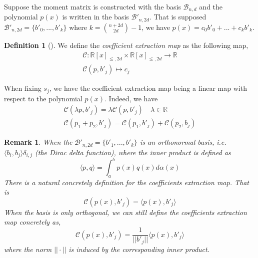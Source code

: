 \documentclass[12pt]{amsart}
\numberwithin{equation}{section}
\newtheorem{remark}[thm]{Remark}
\theoremstyle{definition}
\newtheorem{definition}[thm]{Definition}
\numberwithin{thm}{section}
\begin{document}
Suppose the moment matrix is constructed with the basis $\mathcal{B}_{n, d}$ and the polynomial $p(x)$ is written in the basis $\mathcal{B}'_{n, 2d}$. 
That is supposed $\mathcal{B}'_{n, 2d} = \{b'_0, ..., b'_k\}$ where $k = {n + 2d \choose 2d} - 1$, we have $p(x) = c_0b'_0 + ... + c_kb'_k$.
\begin{definition}[\cite{Recher:Masterthesis}]
     \label{def:cem}
We define the \emph{coefficient extraction map} as the following map,
\begin{equation*}
     \begin{split}
     \mathcal{C}: \mathbb{R}[x]_{\leq, 2d} \times \mathbb{R}[x]_{\leq, 2d} \rightarrow \mathbb{R} \\
     \mathcal{C}(p, b'_j) \mapsto c_j
     \end{split}
\end{equation*}
\end{definition}

\smallskip
When fixing $s_j$, we have the {coefficient extraction map} being a linear map with respect to the polynomial $p(x)$. Indeed, we have 
\begin{equation*}
     \begin{split}
          \mathcal{C}(\lambda p, b'_j) = \lambda \mathcal{C}(p, b'_j) \quad \lambda \in \mathbb{R}
          \\
          \mathcal{C}(p_1 + p_2, b'_j) = \mathcal{C}(p_1, b'_j) + \mathcal{C}(p_2, b_j)
     \end{split}
\end{equation*}

\begin{remark}
     When the $\mathcal{B'}_{n, 2d} = \{b'_1,... ,b'_k\}$ is an orthonormal basis, 
     i.e. $\langle b_i, b_j \rangle \delta_{i,j}$ (the Dirac delta function), where the inner product is defined as
     \begin{equation*} 
          \langle p, q \rangle = \int_a^b p(x) q(x) d\alpha(x)
     \end{equation*}
     There is a natural concretely definition for the \emph{coefficients extraction map}. 
     That is
     \begin{equation*}
          \mathcal{C}(p(x), b'_j) = \langle p(x), b'_j \rangle
     \end{equation*}
     When the basis is only orthogonal, we can still define the \emph{coefficients extraction map} concretely as,
     \begin{equation*}
          \mathcal{C}(p(x), b'_j) = \frac{1}{||b'_j||}\langle p(x), b'_j \rangle 
     \end{equation*}
     where the norm $|| \cdot ||$ is induced by the corresponding inner product.
\end{remark}
\end{document}
